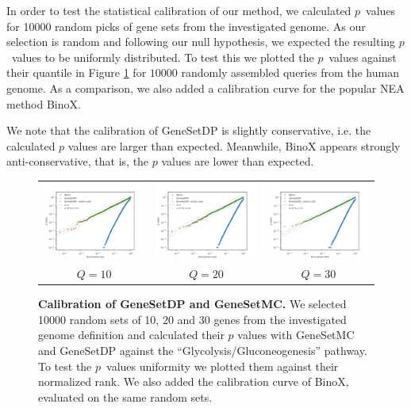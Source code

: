 \documentclass[a4paper,american]{lipics-v2016}
\begin{document}
In order to test the statistical calibration of our method, we calculated $p$~values for 10000 random picks of gene sets from the investigated genome. As our selection is random and following our null hypothesis, we expected the resulting $p$~values to be uniformly distributed. To test this we plotted the $p$~values against their quantile in Figure \ref{fig:calibration} for $10000$ randomly assembled queries from the human genome. As a comparison, we also added a calibration curve for the popular NEA method BinoX\cite{ogris2016novel}.

We note that the calibration of GeneSetDP is slightly conservative, i.e. the calculated $p$ values are larger than expected. Meanwhile, BinoX appears strongly anti-conservative, that is, the $p$ values are lower than expected.

\begin{figure}[htb]
  \begin{center}
    \begin{tabular}{c@{}c@{}c}
      \includegraphics[width=5cm]{figures/calibration_Q10.png} &
      \includegraphics[width=5cm]{figures/calibration_Q20.png} &
      \includegraphics[width=5cm]{figures/calibration_Q30.png} \\
      $Q=10$ & $Q=20$ & $Q=30$
    \end{tabular}
  \end{center}
  \caption{{\bf Calibration of GeneSetDP and GeneSetMC.} We selected 10000 random sets of 10, 20 and 30 genes from the investigated genome definition and calculated their $p$ values with GeneSetMC and GeneSetDP against the ``Glycolysis/Gluconeogenesis'' pathway. To test the $p$~values uniformity we plotted them against their normalized rank. We also added the calibration curve of BinoX, evaluated on the same random sets.}
  \label{fig:calibration}
\end{figure}
\end{document}
